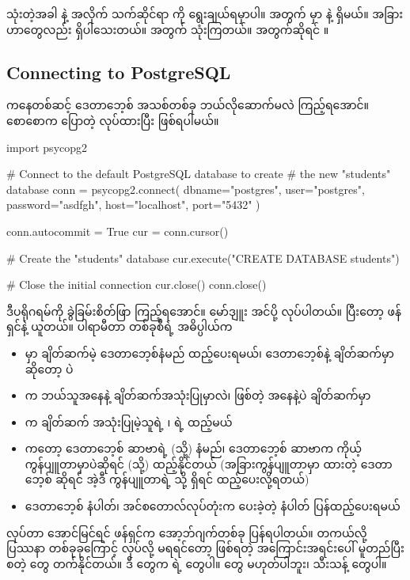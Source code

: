  သုံးတဲ့အခါ  နဲ့  အလိုက် သက်ဆိုင်ရာ  ကို ရွေးချယ်ရမှာပါ။  အတွက်  မှာ  နဲ့  ရှိမယ်။ အခြားဟာတွေလည်း ရှိပါသေးတယ်။  အတွက်  သုံးကြတယ်။  အတွက်ဆိုရင် ။  

\subsection*{Connecting to PostgreSQL}
 ကနေတစ်ဆင့် ဒေတာဘေ့စ် အသစ်တစ်ခု ဘယ်လိုဆောက်မလဲ ကြည့်ရအောင်။ စောစောက ပြောတဲ့   လုပ်ထားပြီး ဖြစ်ရပါမယ်။
%
\begin{py}
import psycopg2

# Connect to the default PostgreSQL database to create 
# the new "students" database
conn = psycopg2.connect(
    dbname="postgres",
    user="postgres",
    password="asdfgh",
    host="localhost",
    port="5432"
)

conn.autocommit = True
cur = conn.cursor()

# Create the "students" database
cur.execute("CREATE DATABASE students")

# Close the initial connection
cur.close()
conn.close()
\end{py}
%
ဒီပရိုဂရမ်ကို ခွဲခြမ်းစိတ်ဖြာ ကြည့်ရအောင်။  မော်ဒျူး အင်ပို့ လုပ်ပါတယ်။ ပြီးတော့  ဖန်ရှင်နဲ့  ယူတယ်။ ပါရာမီတာ တစ်ခုစီရဲ့ အဓိပ္ပါယ်က
%
\begin{itemize}
    \item {} မှာ ချိတ်ဆက်မဲ့ ဒေတာဘေ့စ်နံမည် ထည့်ပေးရမယ်၊  ဒေတာဘေ့စ်နဲ့ ချိတ်ဆက်မှာဆိုတော့  ပဲ
    \item {} က ဘယ်သူအနေနဲ့ ချိတ်ဆက်အသုံးပြုမှာလဲ၊  ဖြစ်တဲ့  အနေနဲ့ပဲ ချိတ်ဆက်မှာ 
    \item {} က ချိတ်ဆက် အသုံးပြုမဲ့သူရဲ့  ၊   ရဲ့  ထည့်မယ် 
    \item {} ကတော့ ဒေတာဘေ့စ် ဆာဗာရဲ့  (သို့)  နံမည်၊ ဒေတာဘေ့စ် ဆာဗာက ကိုယ့်ကွန်ပျူတာမှာပဲဆိုရင်  (သို့)  ထည့်နိုင်တယ် (အခြားကွန်ပျူတာမှာ  ထားတဲ့ ဒေတာဘေ့စ် ဆိုရင် အဲ့ဒီ ကွန်ပျူတာရဲ့  သို့  ရှိရင်  ထည့်ပေးလို့ရတယ်) 
    \item {}  ဒေတာဘေ့စ်  နံပါတ်၊ အင်စတောလ်လုပ်တုံးက ပေးခဲ့တဲ့  နံပါတ် ပြန်ထည့်ပေးရမယ်
\end{itemize}
%
 လုပ်တာ အောင်မြင်ရင်  ဖန်ရှင်က  အော့ဘ်ဂျက်တစ်ခု ပြန်ရပါတယ်။ တကယ်လို့ ပြဿနာ တစ်ခုခုကြောင့်  လုပ်လို့ မရရင်တော့ ဖြစ်ရတဲ့ အကြောင်းအရင်းပေါ် မူတည်ပြီး \fEn{,}  စတဲ့  တွေ တက်နိုင်တယ်။ ဒီ  တွေက   ရဲ့  တွေပါ။  တွေ မဟုတ်ပါဘူး၊  သီးသန့်  တွေပါ။


